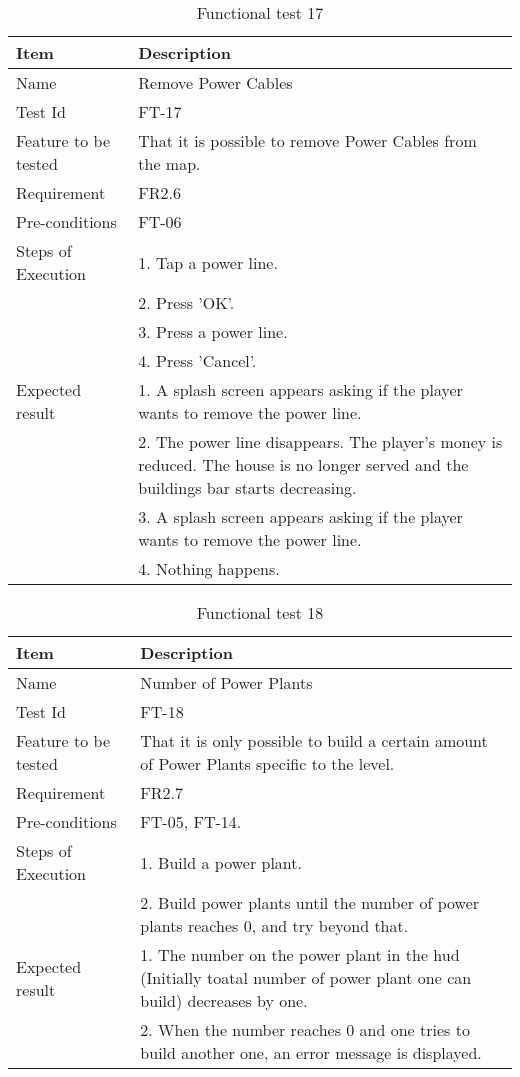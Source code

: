\begin{table}[H]
\centering
	\begin{tabular}{ l | p{8cm} }
		\hline
		{\bf Item} & {\bf Description} \\ \hline
		Name & Remove Power Cables \\ 
		Test Id & FT-17 \\ 
		Feature to be tested & That it is possible to remove Power Cables from the map. \\ 
		Requirement & FR2.6 \\ 
		Pre-conditions & FT-06 \\ 
		Steps of Execution & 1. Tap a power line.  \\ 
		& 2. Press 'OK'. \\
		& 3. Press a power line. \\
		& 4. Press 'Cancel'. \\
		Expected result & 1. A splash screen appears asking if the player wants to remove the power line. \\ 
		& 2. The power line disappears. The player's money is reduced. The house is no longer served and the buildings bar starts decreasing. \\
		& 3. A splash screen appears asking if the player wants to remove the power line. \\
		& 4. Nothing happens. \\
	\end{tabular}
	\caption{Functional test 17}
\end{table}

\begin{table}[H]
\centering
	\begin{tabular}{ l | p{8cm} }
		\hline
		{\bf Item} & {\bf Description} \\ \hline
		Name & Number of Power Plants \\ 
		Test Id & FT-18 \\ 
		Feature to be tested & That it is only possible to build a certain amount of Power Plants specific to the level. \\ 
		Requirement & FR2.7 \\ 
		Pre-conditions & FT-05, FT-14. \\ 
		Steps of Execution & 1. Build a power plant. \\ 
		& 2. Build power plants until the number of power plants reaches 0, and try beyond that. \\
		Expected result & 1. The number on the power plant in the hud (Initially toatal number of power plant one can build) decreases by one. \\
		& 2. When the number reaches 0 and one tries to build another one, an error message is displayed. \\
	\end{tabular}
	\caption{Functional test 18}
\end{table}

